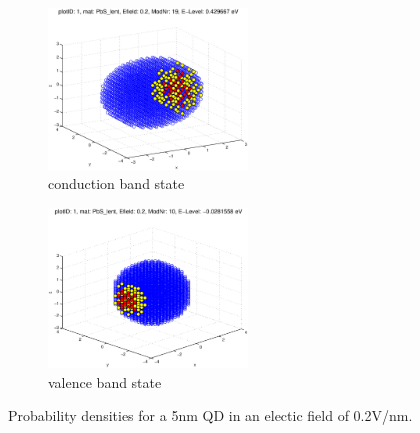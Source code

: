 \begin{figure}
	\centering
	\begin{subfigure}{200px}
		\includegraphics[width=200px]{Fig/Plots/r25v02CB}
		\caption{conduction band state}
	\end{subfigure}
	\begin{subfigure}{200px}
		\includegraphics[width=200px]{Fig/Plots/r25v02VB}
		\caption{valence band state}
	\end{subfigure}	
	\caption{Probability densities for a 5nm QD in an electic field of 0.2V/nm.}
	\label{fig:EfieldWaveFn}
\end{figure}
%
